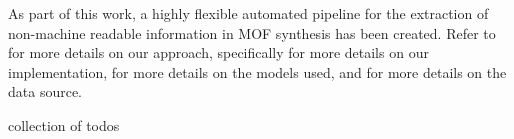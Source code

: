 As part of this work, a highly flexible automated pipeline for the extraction of non-machine readable information in \gls{MOF} synthesis has been created.
Refer to  for more details on our approach, specifically  for more details on our implementation,  for more details on the models used, and  for more details on the data source.


\newpage
collection of todos
